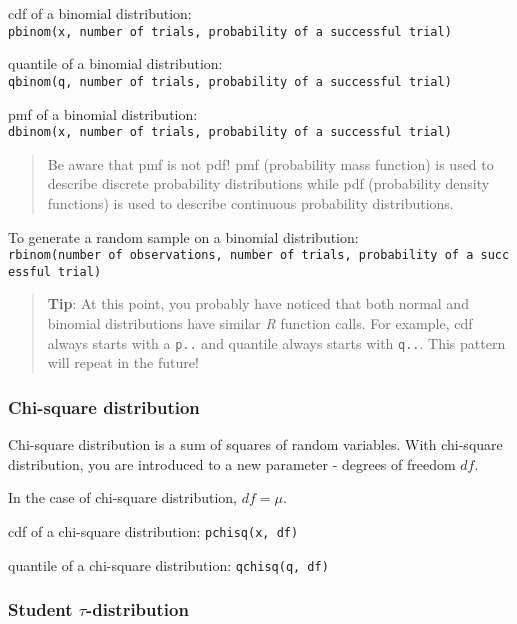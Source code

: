 cdf of a binomial distribution:
\texttt{pbinom(x,\ number\ of\ trials,\ probability\ of\ a\ successful\ trial)}

quantile of a binomial distribution:
\texttt{qbinom(q,\ number\ of\ trials,\ probability\ of\ a\ successful\ trial)}

pmf of a binomial distribution:
\texttt{dbinom(x,\ number\ of\ trials,\ probability\ of\ a\ successful\ trial)}

\begin{quote}
Be aware that pmf is not pdf! pmf (probability mass function) is used to
describe discrete probability distributions while pdf (probability
density functions) is used to describe continuous probability
distributions.
\end{quote}

To generate a random sample on a binomial distribution:
\texttt{rbinom(number\ of\ observations,\ number\ of\ trials,\ probability\ of\ a\ successful\ trial)}

\begin{quote}
\textbf{Tip}: At this point, you probably have noticed that both normal
and binomial distributions have similar \emph{R} function calls. For
example, cdf always starts with a \texttt{p..} and quantile always
starts with \texttt{q..}. This pattern will repeat in the future!
\end{quote}

\hypertarget{chi-square-distribution}{%
\subsubsection{Chi-square distribution}\label{chi-square-distribution}}

Chi-square distribution is a sum of squares of random variables. With
chi-square distribution, you are introduced to a new parameter - degrees
of freedom \(df\).

In the case of chi-square distribution, \(df = \mu\).

cdf of a chi-square distribution: \texttt{pchisq(x,\ df)}

quantile of a chi-square distribution: \texttt{qchisq(q,\ df)}

\hypertarget{student-tau-distribution}{%
\subsubsection{\texorpdfstring{Student
\(\tau\)-distribution}{Student \textbackslash tau-distribution}}\label{student-tau-distribution}}

